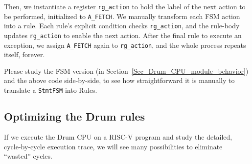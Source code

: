 Then, we instantiate a register \verb|rg_action| to hold the label of
the next action to be performed, initialized to \verb|A_FETCH|.  We
manually transform each FSM action into a rule.  Each rule's explicit
condition checks \verb|rg_action|, and the rule-body updates
\verb|rg_action| to enable the next action.  After the final rule to
execute an exception, we assign \verb|A_FETCH| again to
\verb|rg_action|, and the whole process repeats itself, forever.


Please study the FSM version (in
Section~\ref{Sec_Drum_CPU_module_behavior}) and the above code
side-by-side, to see how straightforward it is manually to translate a
\verb|StmtFSM| into Rules.


\subsection{Optimizing the Drum rules}

\label{Sec_Optimiizing_Drum_Rules}

If we execute the Drum CPU on a RISC-V program and study the detailed,
cycle-by-cycle execution trace, we will see many possibilities to
eliminate ``wasted'' cycles.

